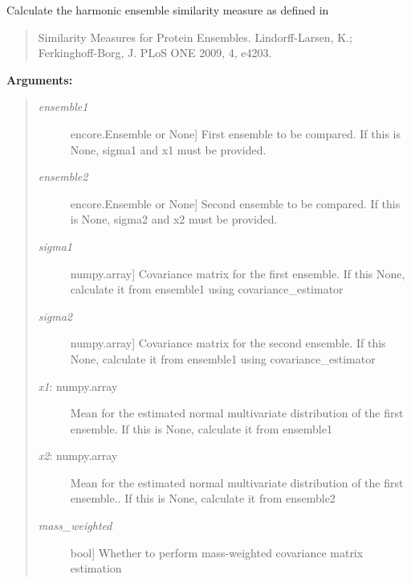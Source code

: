 \documentclass[letterpaper,10pt,english]{sphinxmanual}
\begin{document}

\begin{fulllineitems}
\label{index:encore.similarity.harmonic_ensemble_similarity}
Calculate the harmonic ensemble similarity measure
as defined in
\begin{quote}

Similarity Measures for Protein Ensembles. Lindorff-Larsen, K.; 
Ferkinghoff-Borg, J. PLoS ONE 2009, 4, e4203.
\end{quote}

\textbf{Arguments:}
\begin{quote}
\begin{description}
\item[{\emph{ensemble1}}] \leavevmode{[}encore.Ensemble or None{]}
First ensemble to be compared. If this is None, sigma1 and x1 must be provided.

\item[{\emph{ensemble2}}] \leavevmode{[}encore.Ensemble or None{]}
Second ensemble to be compared. If this is None, sigma2 and x2 must be provided.

\item[{\emph{sigma1}}] \leavevmode{[}numpy.array{]}
Covariance matrix for the first ensemble. If this None, calculate it from ensemble1 using covariance\_estimator

\item[{\emph{sigma2}}] \leavevmode{[}numpy.array{]}
Covariance matrix for the second ensemble. If this None, calculate it from ensemble1 using covariance\_estimator

\item[{\emph{x1}: numpy.array }] \leavevmode
Mean for the estimated normal multivariate distribution of the first ensemble. If this is None, calculate it from ensemble1

\item[{\emph{x2}: numpy.array}] \leavevmode
Mean for the estimated normal multivariate distribution of the first ensemble.. If this is None, calculate it from ensemble2

\item[{\emph{mass\_weighted}}] \leavevmode{[}bool{]}
Whether to perform mass-weighted covariance matrix estimation


\end{description}
\end{quote}
\end{fulllineitems}
\end{document}
